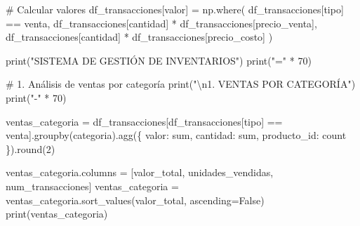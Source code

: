 \documentclass[
  doc,
  floatsintext,
  longtable,
  a4paper,
  nolmodern,
  notxfonts,
  notimes,
  12pt,
  colorlinks=true,linkcolor=blue,citecolor=blue,urlcolor=blue]{apa7}
\newenvironment{Shaded}{\begin{snugshade}}{\end{snugshade}}
\newcommand{\BuiltInTok}[1]{\textcolor[rgb]{0.00,0.23,0.31}{#1}}
\newcommand{\CharTok}[1]{\textcolor[rgb]{0.13,0.47,0.30}{#1}}
\newcommand{\CommentTok}[1]{\textcolor[rgb]{0.37,0.37,0.37}{#1}}
\newcommand{\DecValTok}[1]{\textcolor[rgb]{0.68,0.00,0.00}{#1}}
\newcommand{\NormalTok}[1]{\textcolor[rgb]{0.00,0.23,0.31}{#1}}
\newcommand{\OperatorTok}[1]{\textcolor[rgb]{0.37,0.37,0.37}{#1}}
\newcommand{\StringTok}[1]{\textcolor[rgb]{0.13,0.47,0.30}{#1}}
\newcommand{\VariableTok}[1]{\textcolor[rgb]{0.07,0.07,0.07}{#1}}
\begin{document}
\begin{Shaded}
\begin{Highlighting}[]
\CommentTok{\# Calcular valores}
\NormalTok{df\_transacciones[}\StringTok{\textquotesingle{}valor\textquotesingle{}}\NormalTok{] }\OperatorTok{=}\NormalTok{ np.where(}
\NormalTok{    df\_transacciones[}\StringTok{\textquotesingle{}tipo\textquotesingle{}}\NormalTok{] }\OperatorTok{==} \StringTok{\textquotesingle{}venta\textquotesingle{}}\NormalTok{,}
\NormalTok{    df\_transacciones[}\StringTok{\textquotesingle{}cantidad\textquotesingle{}}\NormalTok{] }\OperatorTok{*}\NormalTok{ df\_transacciones[}\StringTok{\textquotesingle{}precio\_venta\textquotesingle{}}\NormalTok{],}
\NormalTok{    df\_transacciones[}\StringTok{\textquotesingle{}cantidad\textquotesingle{}}\NormalTok{] }\OperatorTok{*}\NormalTok{ df\_transacciones[}\StringTok{\textquotesingle{}precio\_costo\textquotesingle{}}\NormalTok{]}
\NormalTok{)}

\BuiltInTok{print}\NormalTok{(}\StringTok{"SISTEMA DE GESTIÓN DE INVENTARIOS"}\NormalTok{)}
\BuiltInTok{print}\NormalTok{(}\StringTok{"="} \OperatorTok{*} \DecValTok{70}\NormalTok{)}

\CommentTok{\# 1. Análisis de ventas por categoría}
\BuiltInTok{print}\NormalTok{(}\StringTok{"}\CharTok{\textbackslash{}n}\StringTok{1. VENTAS POR CATEGORÍA"}\NormalTok{)}
\BuiltInTok{print}\NormalTok{(}\StringTok{"{-}"} \OperatorTok{*} \DecValTok{70}\NormalTok{)}

\NormalTok{ventas\_categoria }\OperatorTok{=}\NormalTok{ df\_transacciones[df\_transacciones[}\StringTok{\textquotesingle{}tipo\textquotesingle{}}\NormalTok{] }\OperatorTok{==} \StringTok{\textquotesingle{}venta\textquotesingle{}}\NormalTok{].groupby(}\StringTok{\textquotesingle{}categoria\textquotesingle{}}\NormalTok{).agg(\{}
    \StringTok{\textquotesingle{}valor\textquotesingle{}}\NormalTok{: }\StringTok{\textquotesingle{}sum\textquotesingle{}}\NormalTok{,}
    \StringTok{\textquotesingle{}cantidad\textquotesingle{}}\NormalTok{: }\StringTok{\textquotesingle{}sum\textquotesingle{}}\NormalTok{,}
    \StringTok{\textquotesingle{}producto\_id\textquotesingle{}}\NormalTok{: }\StringTok{\textquotesingle{}count\textquotesingle{}}
\NormalTok{\}).}\BuiltInTok{round}\NormalTok{(}\DecValTok{2}\NormalTok{)}

\NormalTok{ventas\_categoria.columns }\OperatorTok{=}\NormalTok{ [}\StringTok{\textquotesingle{}valor\_total\textquotesingle{}}\NormalTok{, }\StringTok{\textquotesingle{}unidades\_vendidas\textquotesingle{}}\NormalTok{, }\StringTok{\textquotesingle{}num\_transacciones\textquotesingle{}}\NormalTok{]}
\NormalTok{ventas\_categoria }\OperatorTok{=}\NormalTok{ ventas\_categoria.sort\_values(}\StringTok{\textquotesingle{}valor\_total\textquotesingle{}}\NormalTok{, ascending}\OperatorTok{=}\VariableTok{False}\NormalTok{)}
\BuiltInTok{print}\NormalTok{(ventas\_categoria)}


\end{Highlighting}
\end{Shaded}
\end{document}
